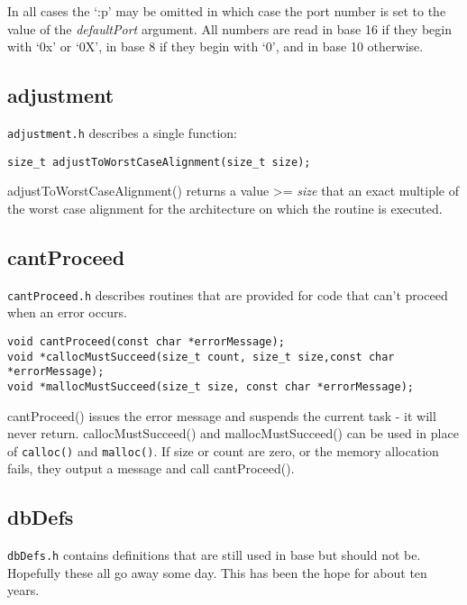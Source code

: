 In all cases the `:p' may be omitted in which case the port number is set to the value of the \emph{defaultPort} argument. All 
numbers are read in base 16 if they begin with `0x' or `0X', in base 8 if they begin with `0', and in base 10 otherwise. 

\subsection{adjustment}

\verb|adjustment.h| describes a single function:

\begin{verbatim}
size_t adjustToWorstCaseAlignment(size_t size);
\end{verbatim}

adjustToWorstCaseAlignment() returns a value \textgreater{}= \emph{size} that an exact multiple of the worst case alignment for the 
architecture on which the routine is executed.

\subsection{cantProceed}

\verb|cantProceed.h| describes routines that are provided for code that can't proceed when an error occurs.

\begin{verbatim}
void cantProceed(const char *errorMessage);
void *callocMustSucceed(size_t count, size_t size,const char *errorMessage);
void *mallocMustSucceed(size_t size, const char *errorMessage);
\end{verbatim}

cantProceed() issues the error message and suspends the current task - it will never return. callocMustSucceed() and 
mallocMustSucceed() can be used in place of \verb|calloc()| and \verb|malloc()|. If size or count are zero, or the memory 
allocation fails, they output a message and call cantProceed().

\subsection{dbDefs}

\verb|dbDefs.h| contains definitions that are still used in base but should not be. Hopefully these all go away some day. This 
has been the hope for about ten years.


